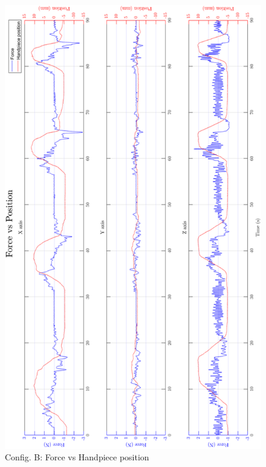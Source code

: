 \begin{figure}[htbp]
\begin{center}
\includegraphics[width=0.9\linewidth]{Images/exp/exp1_2_3.png}
\caption{Config. B: Force vs Handpiece position}
\label{fig: exp1_2_3}
\end{center}
\end{figure}

